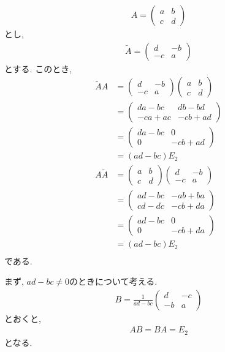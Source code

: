 \begin{align*}
  A=
  \begin{pmatrix}
    a&b\\c&d
  \end{pmatrix}
\end{align*}
とし,
\begin{align*}
  \tilde A =
  \begin{pmatrix}
    d&-b\\-c&a
  \end{pmatrix}
\end{align*}
とする.
このとき,
\begin{align*}
  \tilde A A
  &=
  \begin{pmatrix}
    d&-b\\-c&a
  \end{pmatrix}
  \begin{pmatrix}
    a&b\\c&d
  \end{pmatrix}\\
  &=
  \begin{pmatrix}
    da-bc&db-bd\\-ca+ac&-cb +ad
  \end{pmatrix}\\
  &=
  \begin{pmatrix}
    da-bc&0\\0&-cb +ad
  \end{pmatrix}\\
  &=(ad-bc)E_2\\  
A  \tilde A 
  &=
  \begin{pmatrix}
    a&b\\c&d
  \end{pmatrix}
  \begin{pmatrix}
    d&-b\\-c&a
  \end{pmatrix}\\
  &=
  \begin{pmatrix}
    ad-bc&-ab+ba\\cd-dc&-cb +da
  \end{pmatrix}\\
  &=
  \begin{pmatrix}
    ad-bc&0\\0&-cb +da
  \end{pmatrix}\\
  &=(ad-bc)E_2\\  
\end{align*}
である.

まず, $ad-bc\neq 0$のときについて考える.
\begin{align*}
  B=\frac{1}{ad-bc}
  \begin{pmatrix}
    d&-c\\-b&a
  \end{pmatrix}
\end{align*}
とおくと,
\begin{align*}
  AB=BA=E_2
\end{align*}
となる.


